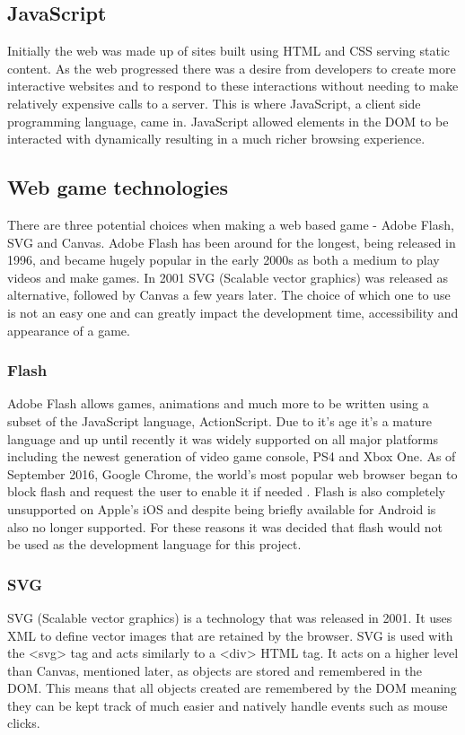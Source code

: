 \documentclass[12pt,a4paper]{report}
\begin{document}
\subsection{JavaScript}
Initially the web was made up of sites built using HTML and CSS serving static content. As the web progressed there was a desire from developers to create more interactive websites and to respond to these interactions without needing to make relatively expensive calls to a server. This is where JavaScript, a client side programming language, came in. JavaScript allowed elements in the DOM to be interacted with dynamically resulting in a much richer browsing experience.

\subsection{Web game technologies}
There are three potential choices when making a web based game - Adobe Flash, SVG and Canvas. Adobe Flash has been around for the longest, being released in 1996, and became hugely popular in the early 2000s as both a medium to play videos and make games. In 2001 SVG (Scalable vector graphics) was released as alternative, followed by Canvas a few years later. The choice of which one to use is not an easy one and can greatly impact the development time, accessibility and appearance of a game. 

\subsubsection{Flash}
Adobe Flash allows games, animations and much more to be written using a subset of the JavaScript language, ActionScript. Due to it's age it's a mature language and up until recently it was widely supported on all major platforms including the newest generation of video game console, PS4 and Xbox One. As of September 2016, Google Chrome, the world's most popular web browser began to block flash and request the user to enable it if needed \citep{FlashInChrome}. Flash is also completely unsupported on Apple's iOS and despite being briefly available for Android is also no longer supported. For these reasons it was decided that flash would not be used as the development language for this project.


\subsubsection{SVG}
SVG (Scalable vector graphics) is a technology that was released in 2001. 
It uses XML to define vector images that are retained by the browser. SVG is used with the <svg> tag and acts similarly to a <div> HTML tag. It acts on a higher level than Canvas, mentioned later, as objects are stored and remembered in the DOM. This means that all objects created are remembered by the DOM meaning they can be kept track of much easier and natively handle events such as mouse clicks.
\end{document}
